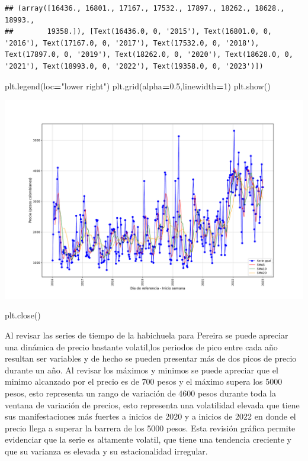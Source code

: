 \documentclass[
]{book}
\newenvironment{Shaded}{\begin{snugshade}}{\end{snugshade}}
\newcommand{\DecValTok}[1]{\textcolor[rgb]{0.00,0.00,0.81}{#1}}
\newcommand{\FloatTok}[1]{\textcolor[rgb]{0.00,0.00,0.81}{#1}}
\newcommand{\NormalTok}[1]{#1}
\newcommand{\OperatorTok}[1]{\textcolor[rgb]{0.81,0.36,0.00}{\textbf{#1}}}
\newcommand{\StringTok}[1]{\textcolor[rgb]{0.31,0.60,0.02}{#1}}
\begin{document}
\begin{verbatim}
## (array([16436., 16801., 17167., 17532., 17897., 18262., 18628., 18993.,
##        19358.]), [Text(16436.0, 0, '2015'), Text(16801.0, 0, '2016'), Text(17167.0, 0, '2017'), Text(17532.0, 0, '2018'), Text(17897.0, 0, '2019'), Text(18262.0, 0, '2020'), Text(18628.0, 0, '2021'), Text(18993.0, 0, '2022'), Text(19358.0, 0, '2023')])
\end{verbatim}

\begin{Shaded}
\begin{Highlighting}[]
\NormalTok{plt.legend(loc}\OperatorTok{=}\StringTok{"lower right"}\NormalTok{)}
\NormalTok{plt.grid(alpha}\OperatorTok{=}\FloatTok{0.5}\NormalTok{,linewidth}\OperatorTok{=}\DecValTok{1}\NormalTok{)}
\NormalTok{plt.show()}
\end{Highlighting}
\end{Shaded}

\includegraphics{bookdown-demo_files/figure-latex/unnamed-chunk-105-85.pdf}

\begin{Shaded}
\begin{Highlighting}[]
\NormalTok{plt.close()}
\end{Highlighting}
\end{Shaded}

Al revisar las series de tiempo de la habichuela para Pereira se puede apreciar una dinámica de precio bastante volatil,los periodos de pico entre cada año resultan ser variables y de hecho se pueden presentar más de dos picos de precio durante un año. Al revisar los máximos y minimos se puede apreciar que el minimo alcanzado por el precio es de 700 pesos y el máximo supera los 5000 pesos, esto representa un rango de variación de 4600 pesos durante toda la ventana de variación de precios, esto representa una volatilidad elevada que tiene sus manifestaciones más fuertes a inicios de 2020 y a inicios de 2022 en donde el precio llega a superar la barrera de los 5000 pesos. Esta revisión gráfica permite evidenciar que la serie es altamente volatil, que tiene una tendencia creciente y que su varianza es elevada y su estacionalidad irregular.
\end{document}
